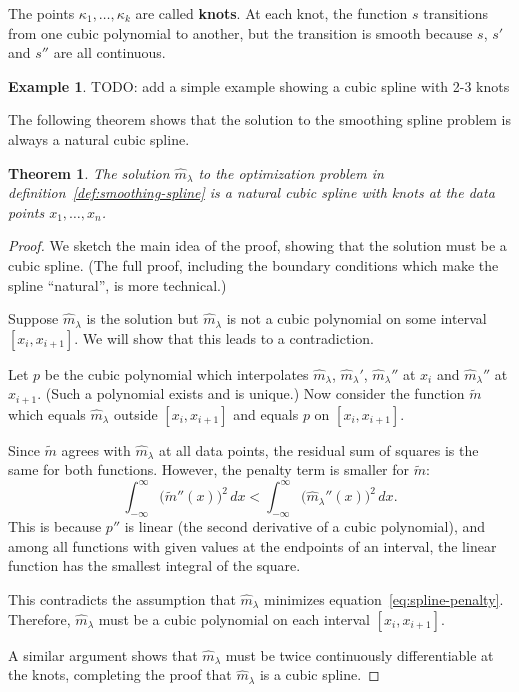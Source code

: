 \documentclass[
  a4paper,
]{article}
\newtheorem{theorem}{Theorem}[section]
\theoremstyle{definition}
\theoremstyle{definition}
\newtheorem{example}{Example}[section]
\theoremstyle{definition}
\theoremstyle{definition}
\theoremstyle{remark}
\begin{document}
The points \(\kappa_1, \ldots, \kappa_k\) are called \textbf{knots}. At each
knot, the function \(s\) transitions from one cubic polynomial to another,
but the transition is smooth because \(s\), \(s'\) and \(s''\) are all continuous.

\begin{example}
TODO: add a simple example showing a cubic spline with 2-3 knots
\end{example}

The following theorem shows that the solution to the smoothing spline
problem is always a natural cubic spline.

\begin{theorem}
\protect\hypertarget{thm:spline-solution}{}\label{thm:spline-solution}The solution \(\hat m_\lambda\) to the optimization problem in
definition~\ref{def:smoothing-spline} is a natural cubic spline with
knots at the data points \(x_1, \ldots, x_n\).
\end{theorem}

\begin{proof}
We sketch the main idea of the proof, showing that the solution must be
a cubic spline. (The full proof, including the boundary conditions which
make the spline ``natural'', is more technical.)

Suppose \(\hat m_\lambda\) is the solution but \(\hat m_\lambda\) is not a
cubic polynomial on some interval \([x_i, x_{i+1}]\). We will show that
this leads to a contradiction.

Let \(p\) be the cubic polynomial which interpolates \(\hat m_\lambda\),
\(\hat m_\lambda'\), \(\hat m_\lambda''\) at \(x_i\) and \(\hat m_\lambda''\)
at \(x_{i+1}\). (Such a polynomial exists and is unique.) Now consider
the function \(\tilde m\) which equals \(\hat m_\lambda\) outside
\([x_i, x_{i+1}]\) and equals \(p\) on \([x_i, x_{i+1}]\).

Since \(\tilde m\) agrees with \(\hat m_\lambda\) at all data points, the
residual sum of squares is the same for both functions. However, the
penalty term is smaller for \(\tilde m\):
\begin{equation*}
  \int_{-\infty}^\infty \bigl( \tilde m''(x) \bigr)^2 \,dx
  < \int_{-\infty}^\infty \bigl( \hat m_\lambda''(x) \bigr)^2 \,dx.
\end{equation*}
This is because \(p''\) is linear (the second derivative of a cubic
polynomial), and among all functions with given values at the endpoints
of an interval, the linear function has the smallest integral of the
square.

This contradicts the assumption that \(\hat m_\lambda\) minimizes
equation~\eqref{eq:spline-penalty}. Therefore, \(\hat m_\lambda\) must be
a cubic polynomial on each interval \([x_i, x_{i+1}]\).

A similar argument shows that \(\hat m_\lambda\) must be twice continuously
differentiable at the knots, completing the proof that \(\hat m_\lambda\)
is a cubic spline.
\end{proof}
\end{document}
